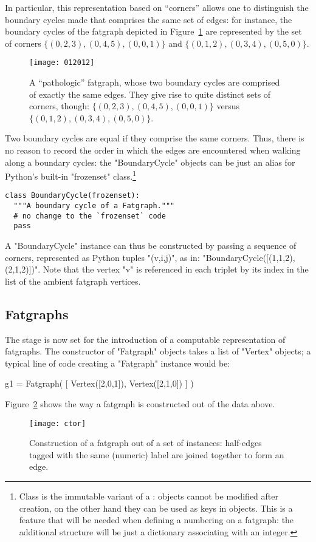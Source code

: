 In particular, this representation based on ``corners'' allows one to
distinguish the boundary cycles made that comprises the same set of
edges: for instance, the boundary cycles of the fatgraph depicted in
Figure~\ref{fig:012012} are represented by the set of corners $\{(0, 2, 3),
(0, 4, 5), (0, 0, 1)\}$ and $\{(0, 1, 2), (0, 3, 4), (0, 5, 0)\}$.
\begin{figure}
  \label{fig:012012}
  \centering
  \texttt{[image: 012012]}
  \caption{A ``pathologic'' fatgraph, whose two boundary cycles are
    comprised of exactly the same edges. They give rise to quite
    distinct sets of corners, though: $\{(0, 2, 3), (0, 4, 5), (0, 0,
    1)\}$ versus $\{(0, 1, 2), (0, 3, 4), (0, 5, 0)\}$.}
\end{figure}

Two boundary cycles are equal if they comprise the same corners.
Thus, there is no reason to record the order in which the edges are
encountered when walking along a boundary cycles: the "BoundaryCycle"
objects can be just an alias for Python's built-in "frozenset"
class.\footnote{Class  is the immutable variant of a
  :  objects cannot be modified after creation, on
  the other hand they can be used as keys in  objects.  This
  is a feature that will be needed when defining a numbering on a
  fatgraph: the additional structure will be just a dictionary
  associating  with an integer.}
\begin{lstlisting}
class BoundaryCycle(frozenset):
  """A boundary cycle of a Fatgraph."""
  # no change to the `frozenset` code
  pass 

\end{lstlisting}
A "BoundaryCycle" instance can thus be constructed by passing a
sequence of corners, represented as Python tuples "(v,i,j)", as in:
"BoundaryCycle([(1,1,2), (2,1,2)])".  Note that the vertex "v" is
referenced in each triplet by its index in the list of the ambient
fatgraph vertices.


\subsection{Fatgraphs}
\label{sec:Fatgraph}

The stage is now set for the introduction of a computable
representation of fatgraphs.  The constructor of "Fatgraph" objects
takes a list of "Vertex" objects; a typical line of code creating a
"Fatgraph" instance would be:
\begin{codexmp}
  g1 = Fatgraph( [ Vertex([2,0,1]), 
                   Vertex([2,1,0]) ] )
\end{codexmp}
Figure~\ref{fig:ctor} shows the way a fatgraph is constructed out of the
data above.
\begin{figure}
  \label{fig:ctor}
  \centering
  \texttt{[image: ctor]}
  \caption{Construction of a fatgraph out of a set of
     instances: half-edges tagged with the same
    (numeric) label are joined together to form an edge.}
\end{figure}

